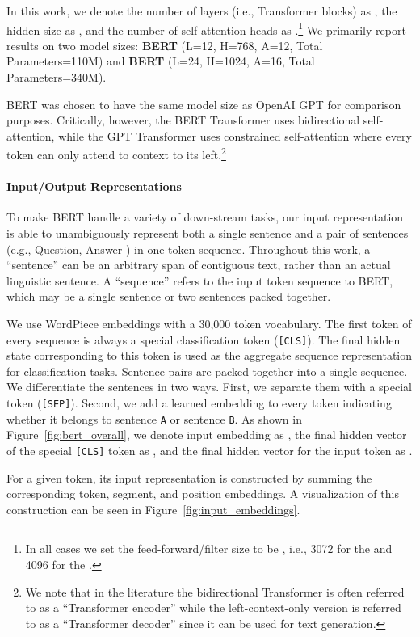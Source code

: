\documentclass[11pt,a4paper]{article}
\newcommand\bertbase{BERT\xspace}
\newcommand\bertlarge{BERT\xspace}
\begin{document}
In this work, we denote the number of layers (i.e., Transformer blocks) as , the hidden size as , and the number of self-attention heads as .\footnote{In all cases we set the feed-forward/filter size to be , i.e., 3072 for the  and 4096 for the .} We primarily report results on two model sizes: {\bf \bertbase} (L=12, H=768, A=12, Total Parameters=110M) and {\bf \bertlarge} (L=24, H=1024, A=16, Total Parameters=340M).

\bertbase was chosen to have the same model size as OpenAI GPT for comparison purposes. Critically, however, the BERT Transformer uses bidirectional self-attention, while the GPT Transformer uses constrained self-attention where every token can only attend to context to its left.\footnote{We note that in the literature the bidirectional Transformer is often referred to as a ``Transformer encoder'' while the left-context-only version is referred to as a ``Transformer decoder'' since it can be used for text generation.} 


\paragraph{Input/Output Representations} To make BERT handle a variety of down-stream tasks,
our input representation is able to unambiguously represent both a single sentence and a pair of  sentences (e.g.,  Question, Answer ) in one token sequence. Throughout this work, a ``sentence'' can be an arbitrary span of contiguous text, rather than an actual linguistic sentence. A ``sequence'' refers to the input token sequence to BERT, which may be a single sentence or two sentences packed together.

We use WordPiece embeddings \cite{wu-etal:2016:_googl} with a 30,000 token vocabulary.
The first token of every sequence is always a special classification token ({\tt [CLS]}). The final hidden state corresponding to this token is used as the aggregate sequence representation for classification tasks. 
Sentence pairs are packed together into a single sequence. We differentiate the sentences in two ways. First, we separate them with a special token ({\tt [SEP]}). Second, we add a learned embedding to every token indicating whether it belongs to sentence {\tt A} or sentence {\tt B}. 
As shown in Figure~\ref{fig:bert_overall}, we denote 
input embedding as , the final hidden vector of the special {\tt [CLS]} token as , and the final hidden vector for the  input token as .

For a given token, its input representation is constructed by summing the corresponding token, segment, and position embeddings. 
A visualization of this construction can be seen in Figure~\ref{fig:input_embeddings}.
\end{document}
